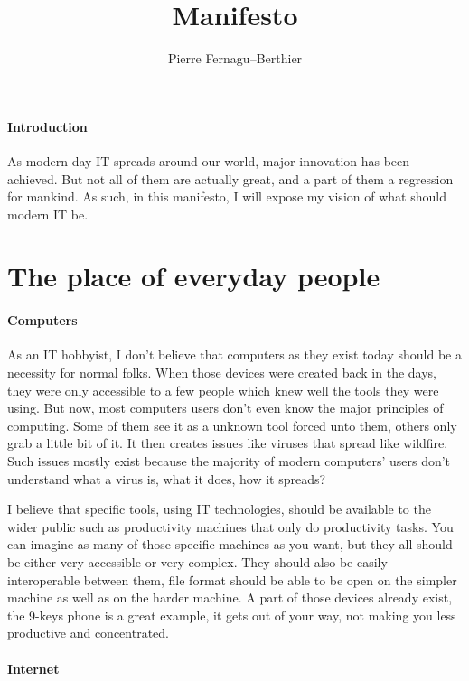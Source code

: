 \documentclass[a4paper,10pt]{article}
\title{Manifesto}
\author{Pierre Fernagu--Berthier}
\begin{document}
\maketitle

\paragraph{Introduction}

As modern day IT spreads around our world, major innovation has been achieved. But not all of them are actually great, and a part of them a regression for mankind. As such, in this manifesto, I will expose my vision of what should modern IT be.

\section{The place of everyday people}

\paragraph{Computers}

As an IT hobbyist, I don't believe that computers as they exist today should be a necessity for normal folks. When those devices were created back in the days, they were only accessible to a few people which knew well the tools they were using. But now, most computers users don't even know the major principles of computing. Some of them see it as a unknown tool forced unto them, others only grab a little bit of it. It then creates issues like viruses that spread like wildfire. Such issues mostly exist because the majority of modern computers' users don't understand what a virus is, what it does, how it spreads?

I believe that specific tools, using IT technologies, should be available to the wider public such as productivity machines that only do productivity tasks. You can imagine as many of those specific machines as you want, but they all should be either very accessible or very complex. They should also be easily interoperable between them, file format should be able to be open on the simpler machine as well as on the harder machine. A part of those devices already exist, the 9-keys phone is a great example, it gets out of your way, not making you less productive and concentrated.

\paragraph{Internet}
\end{document}
